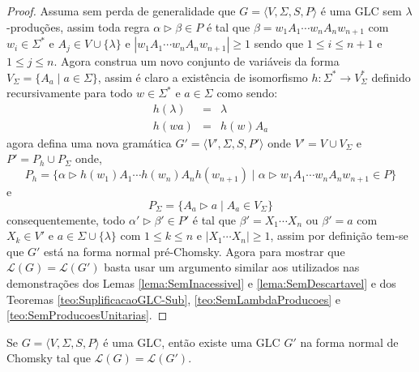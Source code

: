 \begin{proof}
    Assuma sem perda de generalidade que $G = \langle V, \Sigma, S, P \rangle$ é uma GLC sem $\lambda$-produções, assim toda regra $\alpha \rhd \beta \in P$ é tal que $\beta = w_1A_1 \cdots w_{n}A_{n}w_{n+1}$ com $w_i \in \Sigma^*$ e $A_j \in V \cup \{\lambda\}$ e $|w_1A_1 \cdots w_{n}A_{n}w_{n+1}| \geq 1$ sendo que $1 \leq i \leq n+1$ e $1 \leq j \leq n$. Agora construa um novo conjunto de variáveis da forma $V_\Sigma = \{A_a \mid a \in \Sigma\}$, assim é claro a existência de isomorfismo $h: \Sigma^* \rightarrow V_\Sigma^*$ definido recursivamente para todo $w \in \Sigma^*$ e $a \in \Sigma$ como sendo:
    \begin{eqnarray*}
        h(\lambda) & = & \lambda\\
        h(wa) & = & h(w)A_a
    \end{eqnarray*}
    agora defina uma nova gramática $G' = \langle V', \Sigma, S, P' \rangle$ onde $V' = V \cup V_\Sigma$ e $P' = P_h \cup P_\Sigma$ onde, 
    $$P_h = \{\alpha \rhd h(w_1)A_1 \cdots h(w_{n})A_{n}h(w_{n+1}) \mid \alpha \rhd w_1A_1 \cdots w_nA_{n}w_{n+1} \in P\}$$
    e
    $$P_\Sigma = \{A_a \rhd a \mid A_a \in V_\Sigma\}$$
    consequentemente, todo $\alpha' \rhd \beta' \in P'$ é tal que $\beta' = X_1\cdots X_n$ ou $\beta' = a$ com $X_k \in V'$ e $a \in \Sigma \cup \{\lambda\}$ com $1 \leq k \leq n$ e $|X_1\cdots X_n| \geq 1$, assim por definição tem-se que $G'$ está na forma normal pré-Chomsky. Agora para mostrar que $\mathcal{L}(G) = \mathcal{L}(G')$  basta usar um argumento similar aos utilizados nas demonstrações dos Lemas \ref{lema:SemInacessivel} e \ref{lema:SemDescartavel} e dos Teoremas \ref{teo:SuplificacaoGLC-Sub},  \ref{teo:SemLambdaProducoes} e \ref{teo:SemProducoesUnitarias}.
\end{proof}

\begin{theorem}
    Se $G = \langle V, \Sigma, S, P \rangle$ é uma GLC, então existe uma GLC $G'$ na forma normal de Chomsky tal que $\mathcal{L}(G) = \mathcal{L}(G')$.
\end{theorem}

